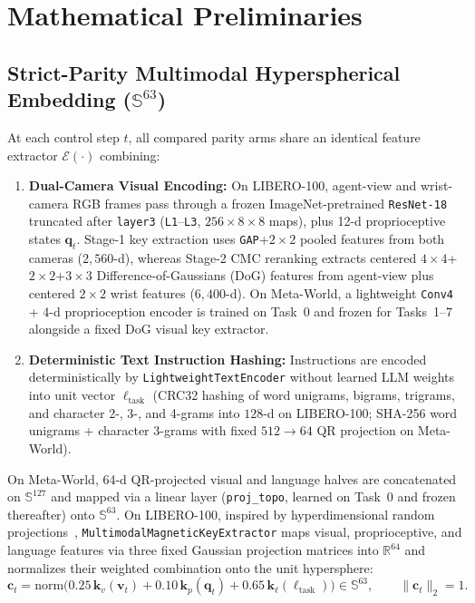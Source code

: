 \documentclass[10pt]{article}
\begin{document}
\section{Mathematical Preliminaries}
\label{sec:prelim}

\subsection{Strict-Parity Multimodal Hyperspherical Embedding (\texorpdfstring{$\mathbb{S}^{63}$}{S63})}
At each control step $t$, all compared parity arms share an identical feature extractor $\mathcal{E}(\cdot)$ combining:
\begin{enumerate}[leftmargin=*,itemsep=1.5pt]
  \item \textbf{Dual-Camera Visual Encoding:} On LIBERO-100, agent-view and wrist-camera RGB frames pass through a frozen ImageNet-pretrained \texttt{ResNet-18}~\cite{he2016resnet} truncated after \texttt{layer3} (\texttt{L1}--\texttt{L3}, $256\times 8\times 8$ maps), plus 12-d proprioceptive states $\mathbf{q}_t$. Stage-1 key extraction uses \texttt{GAP}+$2\times 2$ pooled features from both cameras ($2{,}560$-d), whereas Stage-2 CMC reranking extracts centered $4\times 4$+$2\times 2$+$3\times 3$ Difference-of-Gaussians (DoG) features from agent-view plus centered $2\times 2$ wrist features ($6{,}400$-d). On Meta-World, a lightweight \texttt{Conv4} + 4-d proprioception encoder is trained on Task~0 and frozen for Tasks~1--7 alongside a fixed DoG visual key extractor.
  \item \textbf{Deterministic Text Instruction Hashing:} Instructions are encoded deterministically by \texttt{Lightweight}\allowbreak\texttt{TextEncoder} without learned LLM weights into unit vector $\ell_{\text{task}}$ (CRC32 hashing of word unigrams, bigrams, trigrams, and character 2-, 3-, and 4-grams into $128$-d on LIBERO-100; SHA-256 word unigrams + character 3-grams with fixed $512 \to 64$ QR projection on Meta-World).
\end{enumerate}
On Meta-World, 64-d QR-projected visual and language halves are concatenated on $\mathbb{S}^{127}$ and mapped via a linear layer (\texttt{proj\_topo}, learned on Task~0 and frozen thereafter) onto $\mathbb{S}^{63}$. On LIBERO-100, inspired by hyperdimensional random projections~\cite{kanerva2009hdc}, \texttt{Multimodal}\allowbreak\texttt{Magnetic}\allowbreak\texttt{KeyExtractor} maps visual, proprioceptive, and language features via three fixed Gaussian projection matrices into $\mathbb{R}^{64}$ and normalizes their weighted combination onto the unit hypersphere:
\begin{equation}
  \mathbf{c}_t = \mathrm{norm}\bigl(0.25\,\mathbf{k}_v(\mathbf{v}_t) + 0.10\,\mathbf{k}_p(\mathbf{q}_t) + 0.65\,\mathbf{k}_\ell(\ell_{\text{task}})\bigr) \in \mathbb{S}^{63}, \qquad \|\mathbf{c}_t\|_2 = 1.
\end{equation}
\end{document}

